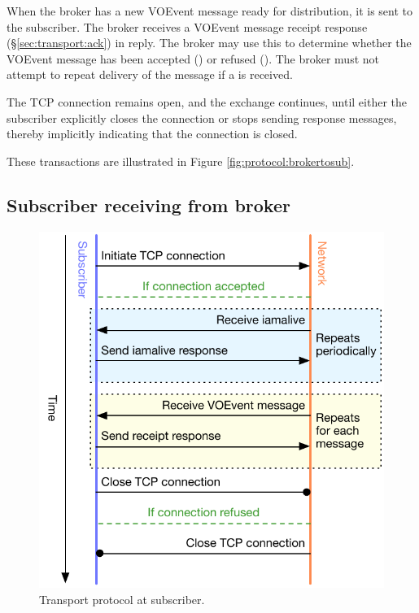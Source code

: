\documentclass[a4paper,11pt]{ivoa}
\begin{document}
When the broker has a new VOEvent message ready for distribution, it is sent
to the subscriber. The broker receives a VOEvent message receipt response
(\S\ref{sec:transport:ack}) in reply. The broker may use this to determine
whether the VOEvent message has been accepted () or refused
(). The broker must not attempt to repeat delivery of the message
if a  is received.

The TCP connection remains open, and the  exchange
continues, until either the subscriber explicitly closes the connection or
stops sending  response messages, thereby implicitly
indicating that the connection is closed.

These transactions are illustrated in Figure \ref{fig:protocol:brokertosub}.

\subsection{Subscriber receiving from broker}
\label{sec:protocol:subfrombroker}

\begin{figure}
  \begin{center}
  \includegraphics{figures/subfrombroker.pdf}
  \end{center}

  \caption{Transport protocol at subscriber.}

  \label{fig:protocol:subfrombroker}
\end{figure}
\end{document}
